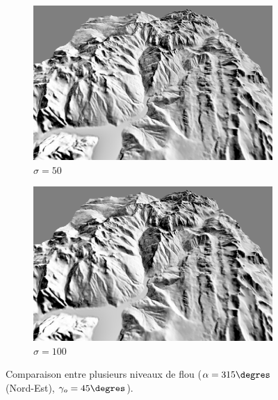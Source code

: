 \begin{figure}[h!]
\begin{subfigure}[t]{0.24\linewidth}
   \centering
   \includegraphics[width=1.0\linewidth]{Resultats/4_our_50.png}
   \caption{$\sigma = 50$}
 \end{subfigure}
 \begin{subfigure}[t]{0.24\linewidth}
   \centering
   \includegraphics[width=1.0\linewidth]{Resultats/4_our_100.png}
   \caption{$\sigma = 100$}
 \end{subfigure}
 \caption{Comparaison entre plusieurs niveaux de flou ($\alpha = 315\degres$ (Nord-Est), $\gamma_o = 45\degres$).}
\end{figure}

